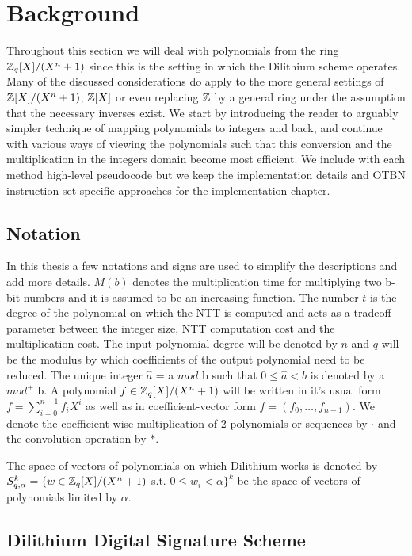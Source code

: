 \chapter{Background}\label{chapter:background}

Throughout this section we will deal with polynomials from the ring $\mathbb{Z}_q[X]/(X^n + 1)$ since this is the setting in which the Dilithium scheme operates. Many of the discussed considerations do apply to the more general settings of $\mathbb{Z}[X]/(X^n + 1)$, $\mathbb{Z}[X]$ or even replacing $\mathbb{Z}$ by a general ring under the assumption that the necessary inverses exist. We start by introducing the reader to arguably simpler technique of mapping polynomials to integers and back, and continue with various ways of viewing the polynomials such that this conversion and the multiplication in the integers domain become most efficient. We include with each method high-level pseudocode but we keep the implementation details and OTBN instruction set specific approaches for the implementation chapter.

\section{Notation}

In this thesis a few notations and signs are used to simplify the descriptions and add more details. $M(b)$ denotes the multiplication time for multiplying two b-bit numbers and it is assumed to be an increasing function. The number $t$ is the degree of the polynomial on which the NTT is computed and acts as a tradeoff parameter between the integer size, NTT computation cost and the multiplication cost. The input polynomial degree will be denoted by $n$ and $q$ will be the modulus by which coefficients of the output polynomial need to be reduced. The unique integer $\hat{a}$ = a $mod$ b such that $0 \leq \hat{a} < b$ is denoted by a $mod^+$ b. A polynomial $f \in \mathbb{Z}_q[X]/(X^n + 1)$ will be written in it's usual form $f = \sum_{i=0}^{n-1} f_i X^i$ as well as in coefficient-vector form $f = (f_0, \ldots, f_{n-1})$. We denote the coefficient-wise multiplication of 2 polynomials or sequences by $\cdot$ and the convolution operation by $*$.

The space of vectors of polynomials on which Dilithium works is denoted by $S_{q, \alpha}^k = \{w \in \mathbb{Z}_q[X]/(X^n + 1)$ s.t. $0 \leq w_i < \alpha\}^k$ be the space of vectors of polynomials limited by $\alpha$.

\section{Dilithium Digital Signature Scheme}

